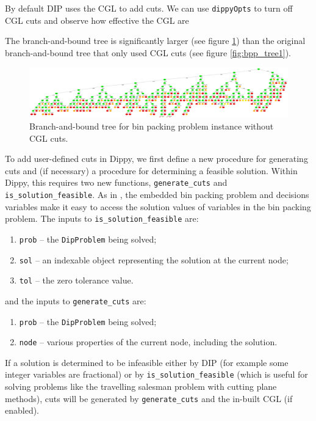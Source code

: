 \begin{sloppypar} By default \ac{DIP} uses the \ac{CGL} to add cuts. We can use \lstinline{dippyOpts} to turn off \ac{CGL} cuts and observe how effective the \ac{CGL} are

The branch-and-bound tree is significantly larger (see figure \ref{fig:bpp_tree4}) than the original branch-and-bound tree that only used \ac{CGL} cuts (see figure \ref{fig:bpp_tree1}).
\begin{figure}[htp]
\begin{center}
\includegraphics[scale=0.075]{img/bpp_tree4.eps}
\end{center}
\caption{Branch-and-bound tree for bin packing problem instance without \ac{CGL} cuts.} \label{fig:bpp_tree4}
\end{figure}


To add user-defined cuts in Dippy, we first define a new procedure for generating cuts and (if necessary) a procedure for determining a feasible solution.
Within Dippy, this requires two new functions, \lstinline{generate_cuts} and \lstinline{is_solution_feasible}.
As in , the embedded bin packing problem and decisions variables make it easy to access the solution values of variables in the bin packing problem.
The inputs to \lstinline{is_solution_feasible} are:
\begin{enumerate}
\item \lstinline{prob} -- the \lstinline{DipProblem} being solved;
\item \lstinline{sol} -- an indexable object representing the solution at the current node;
\item \lstinline{tol} -- the zero tolerance value.
\end{enumerate}
and the inputs to \lstinline{generate_cuts} are:
\begin{enumerate}
\item \lstinline{prob} -- the \lstinline{DipProblem} being solved;
\item \lstinline{node} -- various properties of the current node, including the solution.
\end{enumerate}

If a solution is determined to be infeasible either by \ac{DIP} (for example some integer variables are fractional) or by \lstinline{is_solution_feasible} (which is useful for solving problems like the travelling salesman problem with cutting plane methods), cuts will be generated by \lstinline{generate_cuts} and the in-built \ac{CGL} (if enabled).\end{sloppypar}

